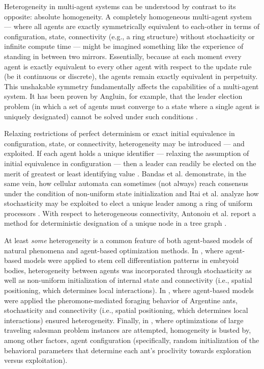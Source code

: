 Heterogeneity in multi-agent systems can be understood by contrast to its opposite: absolute homogeneity.
A completely homogeneous multi-agent system --- where all agents are exactly symmetrically equivalent to each-other in terms of configuration, state, connectivity (e.g., a ring structure) without stochasticity or infinite compute time --- might be imagined something like the experience of standing in between two mirrors.
Essentially, because at each moment every agent is exactly equivalent to every other agent with respect to the update rule (be it continuous or discrete), the agents remain exactly equivalent in perpetuity.
This unshakable symmetry fundamentally affects the capabilities of a multi-agent system.
It has been proven by Angluin, for example, that the leader election problem (in which a set of agents must converge to a state where a single agent is uniquely designated) cannot be solved under such conditions \cite{angluin1980local,banda2015configuration}.

Relaxing restrictions of perfect determinism or exact initial equivalence in configuration, state, or connectivity, heterogeneity may be introduced --- and exploited.
If each agent holds a unique identifier --- relaxing the assumption of initial equivalence in configuration --- then a leader can readily be elected on the merit of greatest or least identifying value \cite{frederickson1987electing}.
Bandas et al. demonstrate, in the same vein, how cellular automata can sometimes (not always) reach consensus under the condition of non-uniform state initialization \cite{banda2015configuration} and Itai et al. analyze how stochasticity may be exploited to elect a unique leader among a ring of uniform processors \cite{itai1981symmetry}.
With respect to heterogeneous connectivity, Antonoiu et al. report a method for deterministic designation of a unique node in a tree graph \cite{antonoiu1996self}.

At least \textit{some} heterogeneity is a common feature of both agent-based models of natural phenomena and agent-based optimization methods.
In \cite{atodd2015quantitative}, where agent-based models were applied to stem cell differentiation patterns in embryoid bodies, heterogeneity between agents was incorporated through stochasticity as well as non-uniform initialization of internal state and connectivity (i.e., spatial positioning, which determines local interactions).
In \cite{perna2012individual}, where agent-based models were applied the pheromone-mediated foraging behavior of Argentine ants, stochasticity and connectivity (i.e., spatial positioning, which determines local interactions) ensured heterogeneity.
Finally, in \cite{fayeez2017h}, where optimizations of large traveling salesman problem instances are attempted, homogeneity is busted by, among other factors, agent configuration (specifically, random initialization of the behavioral parameters that determine each ant's proclivity towards exploration versus exploitation).

